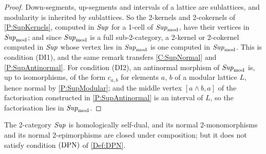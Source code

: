 \begin{proof}
  \leanok
  Down-segments, up-segments and intervals of a lattice are sublattices, and modularity is inherited by sublattices. So the 2-kernels and 2-cokernels of \prox\ref{P:SupKernels}, computed in \(\mathit{Sup}\) for a 1-cell of \(\mathit{Sup}_{\mathrm{mod}}\), have their vertices in \(\mathit{Sup}_{\mathrm{mod}}\); and since \(\mathit{Sup}_{\mathrm{mod}}\) is a full sub-2-category, a 2-kernel or 2-cokernel computed in \(\mathit{Sup}\) whose vertex lies in \(\mathit{Sup}_{\mathrm{mod}}\) is one computed in \(\mathit{Sup}_{\mathrm{mod}}\). This is condition \textup{(DI1)}, and the same remark transfers \corx\ref{C:SupNormal} and \prox\ref{P:SupAntinormal}. For condition \textup{(DI2)}, an antinormal morphism of \(\mathit{Sup}_{\mathrm{mod}}\) is, up to isomorphisms, of the form \(c_{a,b}\) for elements \(a\), \(b\) of a modular lattice \(L\), hence normal by \prox\ref{P:SupModular}; and the middle vertex \([a\wedge b,a]\) of the factorisation constructed in \prox\ref{P:SupAntinormal} is an interval of \(L\), so the factorisation lies in \(\mathit{Sup}_{\mathrm{mod}}\).
\end{proof}

\begin{proposition}
  \label{P:SupNotDPN}   \leanok
  The 2-category \(\mathit{Sup}\) is homologically self-dual, and its normal 2-monomorphisms and its normal 2-epimorphisms are closed under composition; but it does not satisfy condition \(\textup{(DPN)}\) of \ref{Def:DPN}.
\end{proposition}


